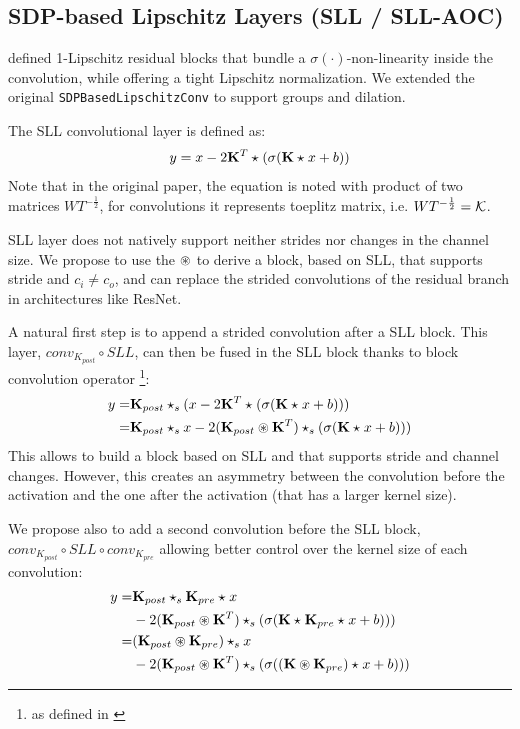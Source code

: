     \subsection{SDP-based Lipschitz Layers (SLL / SLL-AOC)}
    \label{sec:improving_sll}

    \cite{araujo_unified_2023} defined 1-Lipschitz residual blocks that bundle a
    \(\sigma(\cdot)\)-non-linearity inside the convolution, while offering a tight Lipschitz normalization. We extended the original
    \verb|SDPBasedLipschitzConv| to support groups and dilation.

    The SLL convolutional layer is defined as:
    \[
        y = x - 2\mathbf{K}^T \star_{} ( \sigma ( \mathbf{K} \star_{} x + b ))
    \]
    Note that in the original paper, the equation is noted with product of two matrices $WT^{-\frac{1}{2}}$, for convolutions it represents toeplitz matrix, i.e. $WT^{-\frac{1}{2}} =  \mathcal{K}$.
    
    SLL layer does not natively support neither strides nor changes in the channel size.
    We propose to use the $\circledast$ to derive a block, based on SLL, that supports stride and $c_i \neq c_o$, and can replace the strided convolutions of the residual branch in architectures like ResNet.  
    
    A natural first step is to append a strided convolution after a SLL block. This layer, $conv_{K_{post}}\circ SLL$, can then be fused in the SLL block thanks to block convolution operator \footnote{as defined in \cite{li_preventing_2019, boissin2025adaptive}}:
    \begin{align*}
        y =& \mathbf{K}_{post} \star_{s} (x - 2\mathbf{K}^T \star_{} ( \sigma ( \mathbf{K} \star_{} x + b ))) \\
        =&  \mathbf{K}_{post} \star_{s} x - 2(\mathbf{K}_{post} \circledast \mathbf{K}^T) \star_{s} ( \sigma ( \mathbf{K} \star_{} x + b ))) \\
    \end{align*}
    This allows to build a block based on SLL and that supports stride and channel changes. However, this creates an asymmetry between the convolution before the activation and the one after the activation (that has a larger kernel size). 
    
    We propose also to add a second convolution before the SLL block, $conv_{K_{post}}\circ SLL\circ conv_{K_{pre}}$ allowing better control over the kernel size of each convolution:
    \begin{align*}
        y = &\mathbf{K}_{post} \star_{s} \mathbf{K}_{pre} \star_{} x \\
        & - 2(\mathbf{K}_{post} \circledast \mathbf{K}^T) \star_{s} ( \sigma ( \mathbf{K} \star_{} \mathbf{K}_{pre} \star_{} x + b ))) \\
        = &(\mathbf{K}_{post} \circledast \mathbf{K}_{pre}) \star_{s} x \\
        & - 2(\mathbf{K}_{post} \circledast \mathbf{K}^T) \star_{s} ( \sigma ( (\mathbf{K} \circledast \mathbf{K}_{pre}) \star_{} x + b ))) \\
    \end{align*}
    
